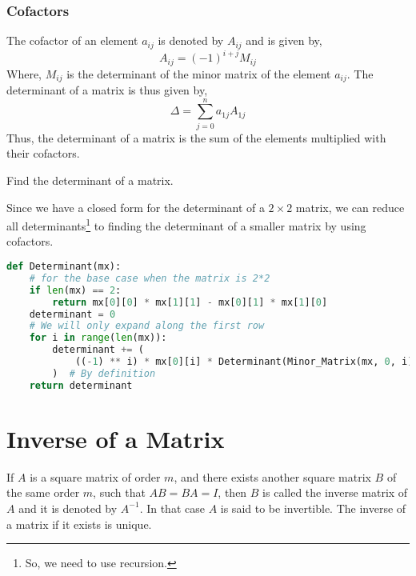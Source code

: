 \subsubsection{Cofactors}
The cofactor of an element $a_{ij}$ is denoted by $A_{ij}$ and is given by,
\[A_{ij}=(-1)^{i+j}M_{ij}\]
Where, $M_{ij}$ is the determinant of the minor matrix of the element $a_{ij}$.
The determinant of a matrix is thus given by,
\[\Delta=\sum\limits_{j=0}^n a_{1j}A_{1j}\]
Thus, the determinant of a matrix is the sum of the elements multiplied with their cofactors.
\begin{eg}
	Find the determinant of a matrix.
\end{eg}
\begin{explanation}
	Since we have a closed form for the determinant of a $2\times 2$ matrix, we can reduce all determinants\footnote{So, we need to use recursion.} to finding the determinant of a smaller matrix by using cofactors.
	\begin{lstlisting}[language=Python]
def Determinant(mx):
	# for the base case when the matrix is 2*2
	if len(mx) == 2:
		return mx[0][0] * mx[1][1] - mx[0][1] * mx[1][0]
	determinant = 0
	# We will only expand along the first row
	for i in range(len(mx)):
		determinant += (
			((-1) ** i) * mx[0][i] * Determinant(Minor_Matrix(mx, 0, i))
		)  # By definition
	return determinant \end{lstlisting}
\end{explanation}
\section{Inverse of a Matrix}
If $A$ is a square matrix of order $m$, and there exists another square matrix $B$ of the same order $m$, such that $AB=BA=I$, then $B$ is called the inverse matrix of $A$ and it is denoted by $A^{-1}$. In that case $A$ is said to be invertible. The inverse of a matrix if it exists is unique.\
